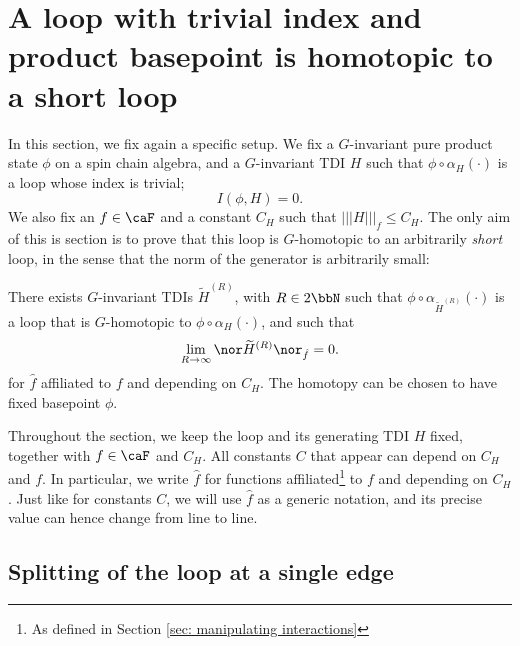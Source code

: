 \section{A loop with trivial index and product basepoint is homotopic to a short loop}  \label{sec: trivial index loop is short}

In this section, we fix again a specific setup. We fix a $G$-invariant pure product state $\phi$ on a spin chain algebra, and a $G$-invariant TDI $H$ such that $\phi\circ \alpha_H(\cdot)$ is a loop  whose index is trivial;
$$I(\phi,H)= 0.$$
We also fix an $f \in \caF$ and a constant $C_H$ such that
$|||H |||_f \leq C_H$. 
The only aim of this is section is to prove that this loop is $G$-homotopic to an arbitrarily \emph{short} loop, in the sense that the norm of the generator is arbitrarily small:
\begin{proposition}\label{prop: loop contractible to small loop}
	
	There exists $G$-invariant TDIs $\widetilde H^{(R)}$, with $R\in 2\bbN$ such that
	$\phi\circ\alpha_{\widetilde H^{(R)}}(\cdot)$ is a loop that is $G$-homotopic to $\phi\circ\alpha_{H}(\cdot)$, and such that
	$$
	\lim_{R\to\infty} \nor \widetilde H^{(R)}\nor_{\hat{f}} =0.
	$$  
	for $\hat{f}$ affiliated to $f$ and depending on $C_H$. The homotopy can be chosen to have fixed basepoint $\phi$. 
\end{proposition} 
Throughout the section, we keep the loop and its generating TDI $H$ fixed, together with $f\in \caF$ and $C_H$.   All constants $C$ that appear can depend on $C_H$ and $f$. 
In particular, we write $\hat{f}$ for functions affiliated\footnote{As defined in Section \ref{sec: manipulating interactions}} to $f$ and depending on $C_H$.
Just like for constants $C$, we will use  $\hat{f}$ as a generic notation, and its precise value can hence change from line to line.   


\subsection{Splitting of the loop at a single edge}\label{sec: splitting at single edge}


